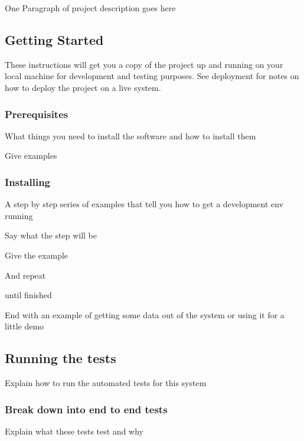 One Paragraph of project description goes here

\subsection*{Getting Started}

These instructions will get you a copy of the project up and running on your local machine for development and testing purposes. See deployment for notes on how to deploy the project on a live system.

\subsubsection*{Prerequisites}

What things you need to install the software and how to install them


\begin{DoxyCode}
Give examples
\end{DoxyCode}


\subsubsection*{Installing}

A step by step series of examples that tell you how to get a development env running

Say what the step will be


\begin{DoxyCode}
Give the example
\end{DoxyCode}


And repeat


\begin{DoxyCode}
until finished
\end{DoxyCode}


End with an example of getting some data out of the system or using it for a little demo

\subsection*{Running the tests}

Explain how to run the automated tests for this system

\subsubsection*{Break down into end to end tests}

Explain what these tests test and why


